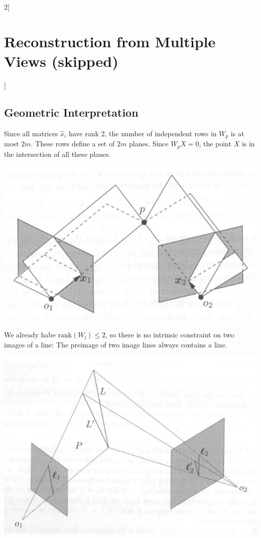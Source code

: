 \documentclass[oneside,fontsize=11pt,paper=a4]{scrartcl}
\newenvironment{myfigure}
  {\par\medskip\noindent\minipage{\linewidth}}
  {\endminipage\par\medskip}
\begin{document}
\begin{multicols}{2}[\section{Reconstruction from Multiple Views (skipped)}]
\subsection{Geometric Interpretation}
Since all matrices $\hat{x}_i$ have rank 2, the number of independent rows in $W_p$ is at most $2m$. These rows define a set of $2m$ planes. Since $W_p X = 0$, the point $X$ is in the intersection of all these planes.
\begin{myfigure}
 \centering
 \includegraphics[width=0.9\linewidth]{Images/Preimage_two_image_points.jpg}
\end{myfigure}
We already habe $\text{rank}(W_l) \leq 2$, so there is no intrinsic constraint on two images of a line: The preimage of two image lines always contains a line.
\begin{myfigure}
 \centering
 \includegraphics[width=0.9\linewidth]{Images/Preimage_two_image_lines.jpg}
\end{myfigure}


\end{multicols}
\end{document}
